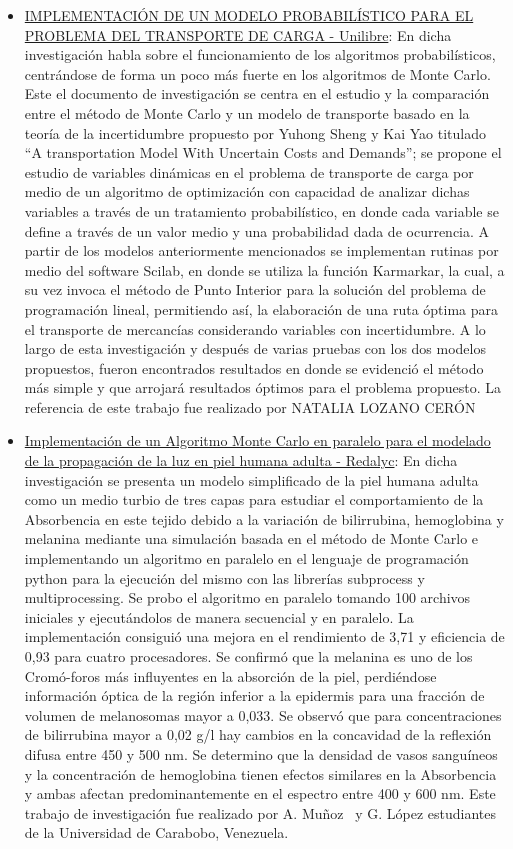 \documentclass{article}
\begin{document}
\begin{itemize}
  \item \href{https://repository.unilibre.edu.co/bitstream/handle/10901/17254/IMPLEMENTACION%20DE%20UN%20MODELO%20PROBALISTICO.pdf}{IMPLEMENTACIÓN DE UN MODELO PROBABILÍSTICO PARA EL PROBLEMA DEL TRANSPORTE DE CARGA - Unilibre}: En dicha investigación habla sobre el funcionamiento de los algoritmos probabilísticos, centrándose de forma un poco más fuerte en los algoritmos de Monte Carlo. 
  Este el documento de investigación se centra en el estudio y la comparación entre el método de Monte Carlo y un modelo de transporte basado en la teoría de la incertidumbre propuesto por Yuhong Sheng y Kai Yao titulado “A transportation Model With Uncertain Costs and Demands”; se propone el estudio de variables dinámicas en el problema de transporte de carga por medio de un algoritmo de optimización con capacidad de analizar dichas variables a través de un tratamiento probabilístico, en donde cada variable se define a través de un valor medio y una probabilidad dada de ocurrencia.
  A partir de los modelos anteriormente mencionados se implementan rutinas por medio del software Scilab, en donde se utiliza la función Karmarkar, la cual, a su vez invoca el método de Punto Interior para la solución del problema de programación lineal, permitiendo así, la elaboración de una ruta óptima para el transporte de mercancías considerando variables con incertidumbre. A lo largo de esta investigación y después de varias pruebas con los dos modelos propuestos, fueron encontrados resultados en donde se evidenció el método más simple y que arrojará resultados óptimos para el problema propuesto. La referencia de este trabajo fue realizado por NATALIA LOZANO CERÓN
  \item \href{https://www.redalyc.org/jatsRepo/707/70757669005/index.html }{Implementación de un Algoritmo Monte Carlo en paralelo para el modelado de la propagación de la luz en piel humana adulta - Redalyc}: En dicha investigación se presenta un modelo simplificado de la piel humana adulta como un medio turbio de tres capas para estudiar el comportamiento de la Absorbencia en este tejido debido a la variación de bilirrubina, hemoglobina y melanina mediante una simulación basada en el método de Monte Carlo e implementando un algoritmo en paralelo en el lenguaje de programación python para la ejecución del mismo con las librerías subprocess y multiprocessing. Se probo el algoritmo en paralelo tomando 100 archivos iniciales y ejecutándolos de manera secuencial y en paralelo. La implementación consiguió una mejora en el rendimiento de 3,71 y eficiencia de 0,93 para cuatro procesadores. Se confirmó que la melanina es uno de los Cromó-foros más influyentes en la absorción de la piel, perdiéndose información óptica de la región inferior a la epidermis para una fracción de volumen de melanosomas mayor a 0,033. Se observó que para concentraciones de bilirrubina mayor a 0,02 g/l hay cambios en la concavidad de la reflexión difusa entre 450 y 500 nm. Se determino que la densidad de vasos sanguíneos y la concentración de hemoglobina tienen efectos similares en la Absorbencia y ambas afectan predominantemente en el espectro entre 400 y 600 nm. Este trabajo de investigación fue realizado por A. Muñoz  y G. López estudiantes de la Universidad de Carabobo, Venezuela.

\end{itemize}
\end{document}
